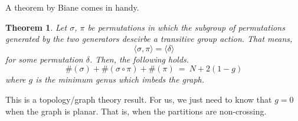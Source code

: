 \documentclass{article}
\def\<{{\langle}}
\def\>{{\rangle}}
\newtheorem{theorem}{Theorem}
\begin{document}
A theorem by Biane comes in handy. 
\begin{theorem}
    Let $\sigma$, $\pi$ be permutations in which 
    the subgroup of permutations generated by the 
    two generators descirbe a transitive group action. 
    That means, 
    \[
    \<\sigma, \pi\> = \<\delta\>
    \]
    for some permutation $\delta$. Then, the following holds. 
    \[
        \#(\sigma) + \#(\sigma \circ \pi) + \#(\pi) 
        \ = \ 
        N + 2(1 - g)
    \]
    where $g$ is the minimum genus which imbeds the graph. 
\end{theorem}

This is a topology/graph theory result. For us, we 
just need to know that $g = 0$ when the graph is planar. 
That is, when the partitions are non-crossing. 
\end{document}

